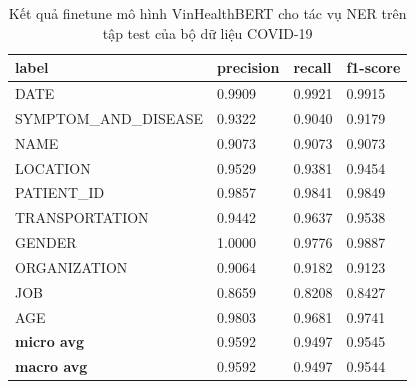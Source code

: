 \documentclass[12pt]{article}
\begin{document}
\begin{table}
\centering
\begin{tabular}{|l|l|l|l|}
\hline
\textbf{label}        & \textbf{precision} & \textbf{recall} & \textbf{f1-score} \\ \hline
DATE                  & 0.9909             & 0.9921          & 0.9915            \\ \hdashline
SYMPTOM\_AND\_DISEASE & 0.9322             & 0.9040          & 0.9179            \\ \hdashline
NAME                  & 0.9073             & 0.9073          & 0.9073            \\ \hdashline
LOCATION              & 0.9529             & 0.9381          & 0.9454            \\ \hdashline
PATIENT\_ID           & 0.9857             & 0.9841          & 0.9849            \\ \hdashline
TRANSPORTATION        & 0.9442             & 0.9637          & 0.9538            \\ \hdashline
GENDER                & 1.0000             & 0.9776          & 0.9887            \\ \hdashline
ORGANIZATION          & 0.9064             & 0.9182          & 0.9123            \\ \hdashline
JOB                   & 0.8659             & 0.8208          & 0.8427            \\ \hdashline
AGE                   & 0.9803             & 0.9681          & 0.9741            \\ \hline
\textbf{micro avg}    & 0.9592             & 0.9497          & 0.9545            \\ \hline
\textbf{macro avg}    & 0.9592             & 0.9497          & 0.9544            \\ \hline
\end{tabular}
\caption{Kết quả finetune mô hình VinHealthBERT cho tác vụ NER trên tập test của bộ dữ liệu COVID-19}
\label{tab:results-test}
\end{table}
\end{document}
